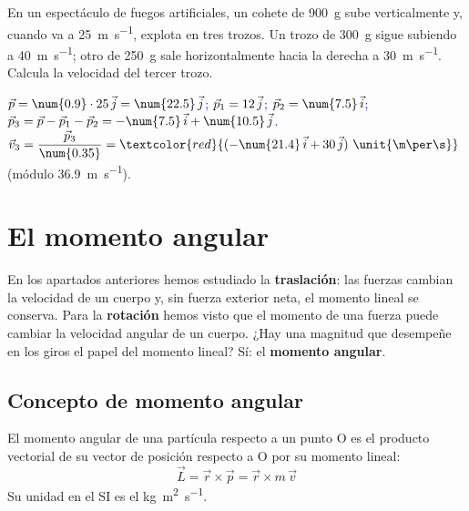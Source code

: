 \begin{exercise}
    En un espectáculo de fuegos artificiales, un cohete de \qty{900}{\g} sube verticalmente y, cuando va a \qty{25}{\m\per\s},
    explota en tres trozos. Un trozo de \qty{300}{\g} sigue subiendo a \qty{40}{\m\per\s}; otro de \qty{250}{\g} sale horizontalmente
    hacia la derecha a \qty{30}{\m\per\s}. Calcula la velocidad del tercer trozo.
    \begin{solu}
        \textcolor{blue}{\(\vec{p} = \num{0.9} \cdot 25\,\jvec = \num{22.5}\,\jvec\); \(\vec{p}_1 = 12\,\vec{j}\);
        \(\vec{p}_2 = \num{7.5}\,\ivec\); \(\vec{p}_3 = \vec{p} - \vec{p}_1 - \vec{p}_2 = -\num{7.5}\,\ivec + \num{10.5}\,\jvec\).}
        \(\vec{v}_3 = \dfrac{\vec{p}_3}{\num{0.35}} = \textcolor{red}{(-\num{21.4}\,\ivec + 30\,\jvec)~\unit{\m\per\s}}\) (módulo
        \qty{36.9}{\m\per\s}).
    \end{solu}
\end{exercise}

\section{El momento angular}\label{sec:ud10-momento-angular}

En los apartados anteriores hemos estudiado la \textbf{traslación}: las fuerzas cambian la velocidad de un cuerpo y, sin fuerza
exterior neta, el momento lineal se conserva. Para la \textbf{rotación} hemos visto que el momento de una fuerza puede cambiar la
velocidad angular de un cuerpo. ¿Hay una magnitud que desempeñe en los giros el papel del momento lineal? Sí: el \textbf{momento
angular}.

\subsection{Concepto de momento angular}

\begin{definition}
    El momento angular de una partícula respecto a un punto O es el producto vectorial de su vector de posición respecto a O por su
    momento lineal:
    \[ \vec{L} = \vec{r} \times \vec{p} = \vec{r} \times m\,\vec{v} \]
    Su unidad en el SI es el \unit{\kg\m\squared\per\s}.
\end{definition}

